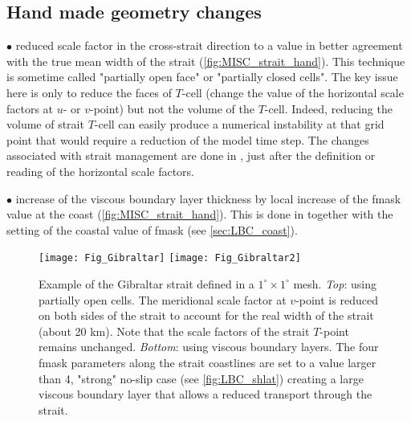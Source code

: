 \documentclass[../main/NEMO_manual]{subfiles}
\begin{document}
\subsection{Hand made geometry changes}
\label{subsec:MISC_strait_hand}

$\bullet$ reduced scale factor in the cross-strait direction to a value in better agreement with
the true mean width of the strait (\autoref{fig:MISC_strait_hand}).
This technique is sometime called "partially open face" or "partially closed cells".
The key issue here is only to reduce the faces of $T$-cell
(\ie change the value of the horizontal scale factors at $u$- or $v$-point) but not the volume of the $T$-cell.
Indeed, reducing the volume of strait $T$-cell can easily produce a numerical instability at
that grid point that would require a reduction of the model time step.
The changes associated with strait management are done in ,
just after the definition or reading of the horizontal scale factors. 

$\bullet$ increase of the viscous boundary layer thickness by local increase of the fmask value at the coast
(\autoref{fig:MISC_strait_hand}).
This is done in  together with the setting of the coastal value of fmask (see  \autoref{sec:LBC_coast}).

\begin{figure}[!tbp]
  \begin{center}
    \texttt{[image: Fig\_Gibraltar]}
    \texttt{[image: Fig\_Gibraltar2]}
    \caption{
      \protect\label{fig:MISC_strait_hand}
      Example of the Gibraltar strait defined in a $1^{\circ} \times 1^{\circ}$ mesh.
      \textit{Top}: using partially open cells.
      The meridional scale factor at $v$-point is reduced on both sides of the strait to account for
      the real width of the strait (about 20 km).
      Note that the scale factors of the strait $T$-point remains unchanged.
      \textit{Bottom}: using viscous boundary layers.
      The four fmask parameters along the strait coastlines are set to a value larger than 4,
      \ie "strong" no-slip case (see \autoref{fig:LBC_shlat}) creating a large viscous boundary layer that
      allows a reduced transport through the strait.
    }
  \end{center}
\end{figure}
\end{document}
